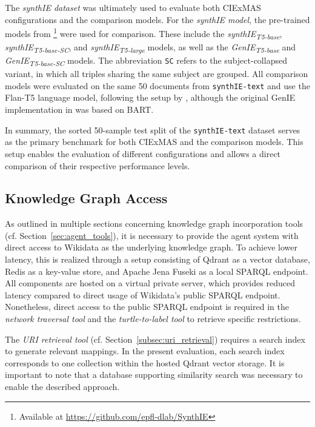 \documentclass[a4paper,oneside,bibliography=totoc]{scrbook}
\begin{document}
The \textit{synthIE dataset} was ultimately used to evaluate both CIExMAS configurations and the comparison models. For the \textit{synthIE model}, the pre-trained models from \citet{Josifoski2023}\footnote{Available at \url{https://github.com/epfl-dlab/SynthIE}} were used for comparison. These include the \textit{synthIE\textsubscript{T5-base}}, \textit{synthIE\textsubscript{T5-base-SC}}, and \textit{synthIE\textsubscript{T5-large}} models, as well as the \textit{GenIE\textsubscript{T5-base}} and \textit{GenIE\textsubscript{T5-base-SC}} models. The abbreviation \texttt{SC} refers to the subject-collapsed variant, in which all triples sharing the same subject are grouped. All comparison models were evaluated on the same 50 documents from \texttt{synthIE-text} and use the Flan-T5 language model, following the setup by \citet{Josifoski2023}, although the original GenIE implementation in \citet{Josifoski2021} was based on BART.

In summary, the sorted 50-sample test split of the \texttt{synthIE-text} dataset serves as the primary benchmark for both CIExMAS and the comparison models. This setup enables the evaluation of different configurations and allows a direct comparison of their respective performance levels.

\subsection{Knowledge Graph Access}
\label{subsec:knowledge_graph_access}

As outlined in multiple sections concerning knowledge graph incorporation tools (cf. Section~\ref{sec:agent_tools}), it is necessary to provide the agent system with direct access to Wikidata as the underlying knowledge graph. To achieve lower latency, this is realized through a setup consisting of Qdrant as a vector database, Redis as a key-value store, and Apache Jena Fuseki as a local \ac{SPARQL} endpoint. All components are hosted on a virtual private server, which provides reduced latency compared to direct usage of Wikidata’s public \ac{SPARQL} endpoint. Nonetheless, direct access to the public \ac{SPARQL} endpoint is required in the \textit{network traversal tool} and the \textit{turtle-to-label tool} to retrieve specific restrictions.

The \textit{URI retrieval tool} (cf. Section~\ref{subsec:uri_retrieval}) requires a search index to generate relevant mappings. In the present evaluation, each search index corresponds to one collection within the hosted Qdrant vector storage. It is important to note that a database supporting similarity search was necessary to enable the described approach.
\end{document}
